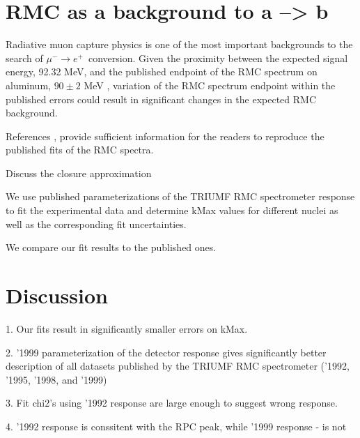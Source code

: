 \documentclass[12pt]{article}
\newcommand {\MuMinusEPlus} {\mbox{$\mu^- \rightarrow e^+$}}
\begin{document}
\section{ RMC as a background to a --> b }
% 
% 

Radiative muon capture physics is one of the most important backgrounds to the search
of \MuMinusEPlus\ conversion. Given the proximity between the expected signal energy,
92.32 MeV, and the published endpoint of the RMC spectrum on aluminum, $90 \pm 2$ MeV
\cite{RMC_1999_PhysRevC.59.2853}, variation of the RMC spectrum endpoint within the
published errors could result in significant changes in the expected RMC background.

References \cite{RMC_1992_PhysRevC.46.1094}, \cite{RMC_1999_PhysRevC.59.2853} provide
sufficient information for the readers to reproduce the published fits of the
RMC spectra.

Discuss the closure approximation

We use published parameterizations of the TRIUMF RMC spectrometer response
to fit the experimental data and determine kMax values for different nuclei
as well as the corresponding fit uncertainties.

We compare our fit results to the published ones.




\section { Discussion }


1. Our fits result in significantly smaller errors on kMax.

2. '1999 parameterization of the detector response gives significantly better
    description of all datasets published by the TRIUMF RMC spectrometer
    ('1992, '1995, '1998, and '1999)

    3. Fit chi2's using '1992 response are large enough to suggest wrong response.

    4. '1992 response is conssitent with the RPC peak, while '1999 response - is not
\end{document}
